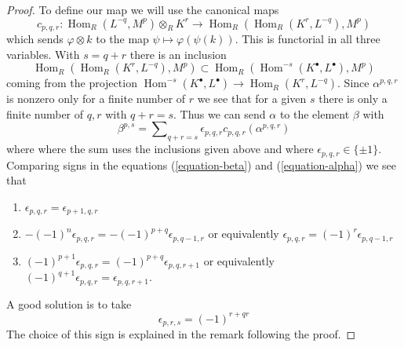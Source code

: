 \documentclass[10pt,a4paper]{amsart}
\theoremstyle{plain}
\theoremstyle{definition}
\theoremstyle{remark}
\numberwithin{equation}{subsection}
\def\Hom{\mathop{\mathrm{Hom}}\nolimits}
\begin{document}
\begin{proof}
\noindent
To define our map we will use the canonical maps
$$
c_{p, q, r} : 
\Hom_R(L^{-q}, M^p) \otimes_R K^r
\longrightarrow
\Hom_R(\Hom_R(K^r, L^{-q}), M^p)
$$
which sends $\varphi \otimes k$ to the map $\psi \mapsto \varphi(\psi(k))$.
This is functorial in all three variables. With $s = q + r$
there is an inclusion
$$
\Hom_R(\Hom_R(K^r, L^{-q}), M^p) \subset
\Hom_R(\Hom^{-s}(K^\bullet, L^\bullet), M^p)
$$
coming from the projection
$\Hom^{-s}(K^\bullet, L^\bullet) \to \Hom_R(K^r, L^{-q})$.
Since $\alpha^{p, q, r}$
is nonzero only for a finite number of $r$ we see that for a given
$s$ there is only a finite number of $q, r$ with $q + r = s$.
Thus we can send $\alpha$ to the element $\beta$ with
$$
\beta^{p, s} =
\sum\nolimits_{q + r = s} \epsilon_{p, q, r} c_{p, q, r}(\alpha^{p, q, r})
$$
where where the sum uses the inclusions given above and where
$\epsilon_{p, q, r} \in \{\pm 1\}$. Comparing signs in the
equations (\ref{equation-beta}) and (\ref{equation-alpha})
we see that
\begin{enumerate}
\item $\epsilon_{p, q, r} = \epsilon_{p + 1, q, r}$
\item $-(-1)^n\epsilon_{p, q, r} = -(-1)^{p + q}\epsilon_{p, q - 1, r}$
or equivalently $\epsilon_{p, q, r} = (-1)^r\epsilon_{p, q - 1, r}$
\item $(-1)^{p + 1}\epsilon_{p, q, r} = (-1)^{p + q}\epsilon_{p, q, r + 1}$
or equivalently
$(-1)^{q + 1}\epsilon_{p, q, r} = \epsilon_{p, q, r + 1}$.
\end{enumerate}
A good solution is to take
$$
\epsilon_{p, r, s} = (-1)^{r + qr}
$$
The choice of this sign is explained in the remark following
the proof.
\end{proof}
\end{document}
